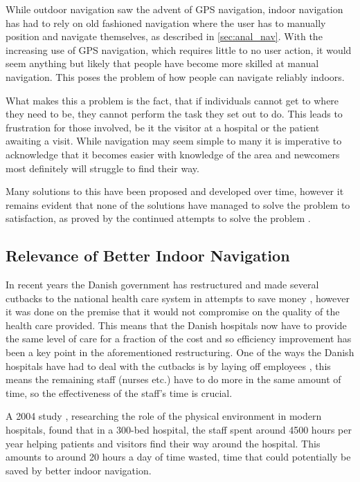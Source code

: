 While outdoor navigation saw the advent of GPS navigation, indoor navigation has had to rely on old fashioned navigation where the user has to manually position and navigate themselves, as described in \cref{sec:anal_nav}. With the increasing use of GPS navigation, which requires little to no user action, it would seem anything but likely that people have become more skilled at manual navigation. This poses the problem of how people can navigate reliably indoors.

What makes this a problem is the fact, that if individuals cannot get to where they need to be, they cannot perform the task they set out to do. This leads to frustration for those involved, be it the visitor at a hospital or the patient awaiting a visit. While navigation may seem simple to many it is imperative to acknowledge that it becomes easier with knowledge of the area and newcomers most definitely will struggle to find their way.

Many solutions to this have been proposed and developed over time, however it remains evident that none of the solutions have managed to solve the problem to satisfaction, as proved by the continued attempts to solve the problem \cite{skejby_attempt}.

\subsection{Relevance of Better Indoor Navigation}
In recent years the Danish government has restructured and made several cutbacks to the national health care system in attempts to save money \cite{cutback_danNHS}, however it was done on the premise that it would not compromise on the quality of the health care provided. This means that the Danish hospitals now have to provide the same level of care for a fraction of the cost and so efficiency improvement has been a key point in the aforementioned restructuring. One of the ways the Danish hospitals have had to deal with the cutbacks is by laying off employees \cite{cutback_firing}, this means the remaining staff (nurses etc.) have to do more in the same amount of time, so the effectiveness of the staff's time is crucial.

A 2004 study \cite{twaste_2004}, researching the role of the physical environment in modern hospitals, found that in a 300-bed hospital, the staff spent around 4500 hours per year helping patients and visitors find their way around the hospital. This amounts to around 20 hours a day of time wasted, time that could potentially be saved by better indoor navigation.

